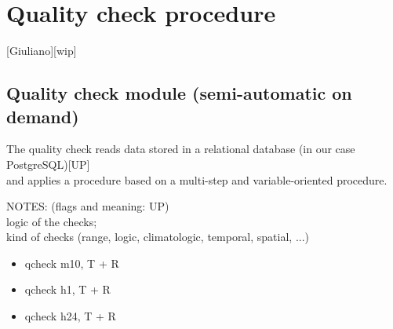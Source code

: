 \documentclass[authoryear,preprint,review,12pt]{elsarticle}
\begin{document}
\section{Quality check procedure}[Giuliano][wip] \label{sec:qcheck}

\subsection{Quality check module (semi-automatic on demand)}
The quality check reads data stored in a relational database (in our case PostgreSQL)[UP]\\
and applies a procedure based on a multi-step and variable-oriented procedure.

NOTES: (flags and meaning: UP)\\
logic of the checks;\\
kind of checks (range, logic, climatologic, temporal, spatial, ...)

\begin{itemize}
    \item qcheck m10, T + R
    \item qcheck h1,  T + R
    \item qcheck h24, T + R
\end{itemize}
\end{document}
